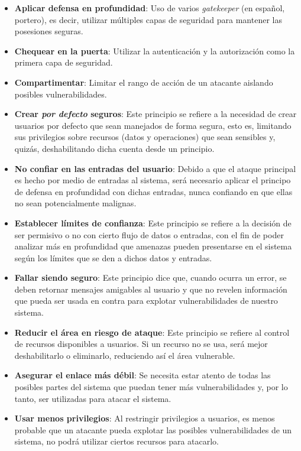 \begin{itemize}
 \item \textbf{Aplicar defensa en profundidad}: Uso de varios \textit{gatekeeper} (en español, portero), es decir, utilizar múltiples capas de seguridad para mantener las posesiones seguras.
 \item \textbf{Chequear en la puerta}: Utilizar la autenticación y la autorización como la primera capa de seguridad.
 \item \textbf{Compartimentar}: Limitar el rango de acción de un atacante aislando posibles vulnerabilidades.
 \item \textbf{Crear \textit{por defecto} seguros}: Este principio se refiere a la necesidad de crear usuarios por defecto que sean manejados de forma segura, esto es, limitando sus privilegios sobre recursos (datos y operaciones) que sean sensibles y, quizás, deshabilitando dicha cuenta desde un principio.
 \item \textbf{No confiar en las entradas del usuario}: Debido a que el ataque principal es hecho por medio de entradas al sistema, será necesario aplicar el principo de defensa en profundidad con dichas entradas, nunca confiando en que ellas no sean potencialmente malignas.
 \item \textbf{Establecer límites de confianza}: Este principio se refiere a la decisión de ser permisivo o no con cierto flujo de datos o entradas, con el fin de poder analizar más en profundidad que amenazas pueden presentarse en el sistema según los límites que se den a dichos datos y entradas.
 \item \textbf{Fallar siendo seguro}: Este principio dice que, cuando ocurra un error, se deben retornar mensajes amigables al usuario y que no revelen información que pueda ser usada en contra para explotar vulnerabilidades de nuestro sistema.
 \item \textbf{Reducir el área en riesgo de ataque}: Este principio se refiere al control de recursos disponibles a usuarios. Si un recurso no se usa, será mejor deshabilitarlo o eliminarlo, reduciendo así el área vulnerable.
 \item \textbf{Asegurar el enlace más débil}: Se necesita estar atento de todas las posibles partes del sistema que puedan tener más vulnerabilidades y, por lo tanto, ser utilizadas para atacar el sistema.
 \item \textbf{Usar menos privilegios}: Al restringir privilegios a usuarios, es menos probable que un atacante pueda explotar las posibles vulnerabilidades de un sistema, no podrá utilizar ciertos recursos para atacarlo.
\end{itemize}

